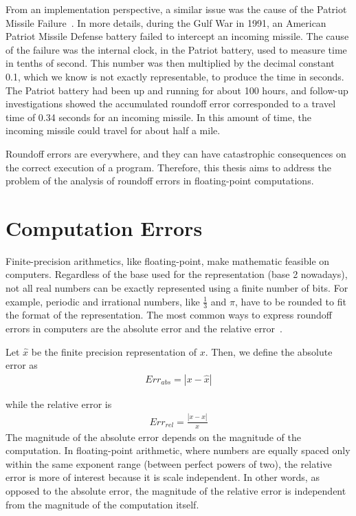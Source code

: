 %
From an implementation perspective, a similar issue was the cause of the Patriot Missile Failure~\cite{patriot}.
%
In more details, during the Gulf War in 1991, an American Patriot Missile Defense battery failed to intercept an incoming missile.
%
The cause of the failure was the internal clock, in the Patriot battery, used to measure time in tenths of second.
%
This number was then multiplied by the decimal constant 0.1, which we know is not exactly representable, to produce the time in seconds.
%
The Patriot battery had been up and running for about 100 hours, and follow-up investigations showed the accumulated roundoff error corresponded to a travel time of 0.34 seconds for an incoming missile. 
%
In this amount of time, the incoming missile could travel for about half a mile.
%

Roundoff errors are everywhere, and they can have catastrophic consequences on the correct execution of a program.
%
Therefore, this thesis aims to address the problem of the analysis of roundoff errors in floating-point computations.
%
\section{Computation Errors}
%

Finite-precision arithmetics, like floating-point, make mathematic feasible on computers. 
%
Regardless of the base used for the representation (base 2 nowadays), not all real numbers can be exactly represented using a finite number of bits.
%
For example, periodic and irrational numbers, like $\frac{1}{3}$ and $\pi$, have to be rounded to fit the format of the representation. 
%
%
%
The most common ways to express roundoff errors in computers are the absolute error and the relative error~\cite{higham2002accuracy}.
%

Let $\widehat{x}$ be the finite precision representation of $x$. Then, we define the absolute error as
%
\begin{align}
Err_{abs}=|x-\widehat{x}|\label{absolute}
\end{align}
%

while the relative error is
%
\begin{align}
Err_{rel}=\frac{|x-\widehat{x}|}{x}\label{relative}
\end{align}
%
The magnitude of the absolute error depends on the magnitude of the computation.
%
In floating-point arithmetic, where numbers are equally spaced only within the same exponent range (between perfect powers of two), the relative error is more of interest because it is scale independent.
%
In other words, as opposed to the absolute error, the magnitude of the relative error is independent from the magnitude of the computation itself.
%

